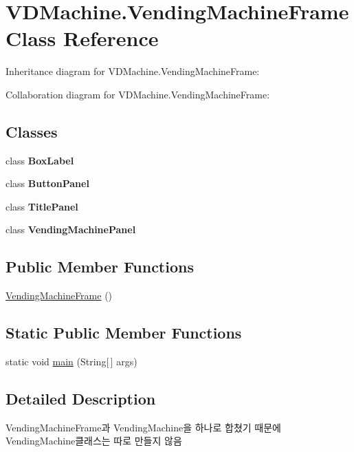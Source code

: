 \hypertarget{class_v_d_machine_1_1_vending_machine_frame}{}\section{V\+D\+Machine.\+Vending\+Machine\+Frame Class Reference}
\label{class_v_d_machine_1_1_vending_machine_frame}


Inheritance diagram for V\+D\+Machine.\+Vending\+Machine\+Frame\+:


Collaboration diagram for V\+D\+Machine.\+Vending\+Machine\+Frame\+:
\subsection*{Classes}
\begin{DoxyCompactItemize}
\item 
class {\bfseries Box\+Label}
\item 
class {\bfseries Button\+Panel}
\item 
class {\bfseries Title\+Panel}
\item 
class {\bfseries Vending\+Machine\+Panel}
\end{DoxyCompactItemize}
\subsection*{Public Member Functions}
\begin{DoxyCompactItemize}
\item 
\hyperlink{class_v_d_machine_1_1_vending_machine_frame_ab7111fa7a43314902474063faf9a530e}{Vending\+Machine\+Frame} ()
\end{DoxyCompactItemize}
\subsection*{Static Public Member Functions}
\begin{DoxyCompactItemize}
\item 
static void \hyperlink{class_v_d_machine_1_1_vending_machine_frame_a60df9516f3b8666657b1878e3ccde2e6}{main} (String\mbox{[}$\,$\mbox{]} args)
\end{DoxyCompactItemize}


\subsection{Detailed Description}
Vending\+Machine\+Frame과 Vending\+Machine을 하나로 합쳤기 때문에 Vending\+Machine클래스는 따로 만들지 않음


